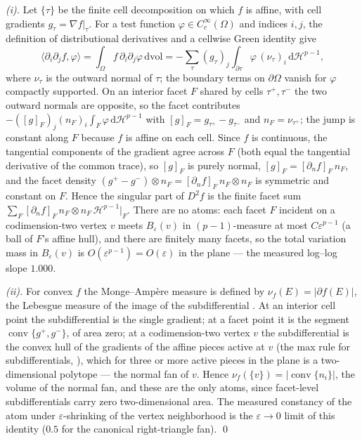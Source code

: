 \documentclass[11pt,a4paper]{article}
\theoremstyle{plain}
\theoremstyle{definition}
\theoremstyle{remark}
\newcommand{\HH}{\mathcal{H}}
\newcommand{\dvol}{\,\mathrm{dvol}}
\begin{document}
\emph{(i).} Let $\{\tau\}$ be the finite cell decomposition on which
$f$ is affine, with cell gradients $g_{\tau} = \nabla f|_{\tau}$. For
a test function $\varphi \in C_c^\infty(\Omega)$ and indices $i,j$,
the definition of distributional derivatives and a cellwise Green
identity give
\[
\langle \partial_i\partial_j f, \varphi \rangle
= \int_\Omega f\, \partial_i\partial_j\varphi \dvol
= -\sum_{\tau} (g_\tau)_j \int_{\partial\tau} \varphi\,
(\nu_\tau)_i \,\mathrm{d}\HH^{p-1},
\]
where $\nu_\tau$ is the outward normal of $\tau$; the boundary terms
on $\partial\Omega$ vanish for $\varphi$ compactly supported. On an
interior facet $F$ shared by cells $\tau^{+}, \tau^{-}$ the two
outward normals are opposite, so the facet contributes
$-([g]_F)_j (n_F)_i \int_F \varphi\,\mathrm{d}\HH^{p-1}$ with
$[g]_F = g_{\tau^{+}} - g_{\tau^{-}}$ and $n_F = \nu_{\tau^{+}}$;
the jump is constant along $F$ because $f$ is affine on each cell.
Since $f$ is continuous, the tangential components of the gradient
agree across $F$ (both equal the tangential derivative of the common
trace), so $[g]_F$ is purely normal, $[g]_F =
[\partial_{n}f]_F\,n_F$, and the facet density
$(g^{+}-g^{-}) \otimes n_F = [\partial_{n}f]_F\, n_F \otimes n_F$ is
symmetric and constant on $F$. Hence the singular part of $D^{2}f$
is the finite facet sum $\sum_F [\partial_n f]_F\, n_F \otimes
n_F\, \HH^{p-1}|_F$. There are no atoms: each facet $F$
incident on a codimension-two vertex $v$ meets $B_\varepsilon(v)$ in
$(p-1)$-measure at most $C\varepsilon^{p-1}$ (a ball of $F$'s affine
hull), and there are finitely many facets, so the total variation
mass in $B_\varepsilon(v)$ is $O(\varepsilon^{p-1}) = O(\varepsilon)$
in the plane --- the measured log--log slope $1.000$.

\emph{(ii).} For convex $f$ the Monge--Amp\`ere measure is defined by
$\nu_f(E) = |\partial f(E)|$, the Lebesgue measure of the image of
the subdifferential \citep{gutierrez2001}. At an interior cell point
the subdifferential is the single gradient; at a facet point it is
the segment $\operatorname{conv}\{g^{+}, g^{-}\}$, of area zero; at
a codimension-two vertex $v$ the subdifferential is the convex hull
of the gradients of the affine pieces active at $v$ (the max rule
for subdifferentials, \citealp{rockafellar1970}), which for three or
more active pieces in the plane is a two-dimensional polytope ---
the normal fan of $v$. Hence $\nu_f(\{v\}) =
|\operatorname{conv}\{n_i\}|$, the volume of the normal fan, and
these are the only atoms, since facet-level subdifferentials carry
zero two-dimensional area. The measured constancy of the atom under
$\varepsilon$-shrinking of the vertex neighborhood is the
$\varepsilon \to 0$ limit of this identity ($0.5$ for the canonical
right-triangle fan). \qed
\end{document}
